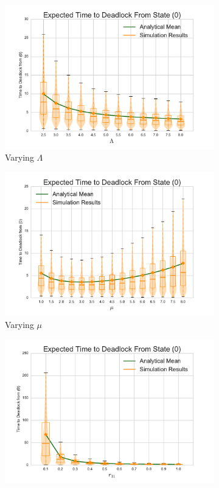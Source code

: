 \documentclass{article}
\begin{document}
\begin{figure}[!htbp]
  \begin{subfigure}[b]{0.5\textwidth}
    \includegraphics[width=\textwidth]{images/varyL_1Nms}
    \caption{Varying $\Lambda$}
    \label{fig:1Nms_L}
  \end{subfigure}
  \begin{subfigure}[b]{0.5\textwidth}
    \includegraphics[width=\textwidth]{images/varymu_1Nms}
    \caption{Varying $\mu$}
    \label{fig:1Nms_mu}
  \end{subfigure}
  \begin{subfigure}[b]{0.5\textwidth}
    \includegraphics[width=\textwidth]{images/varyr11_1Nms}

\end{subfigure}
\end{figure}
\end{document}
